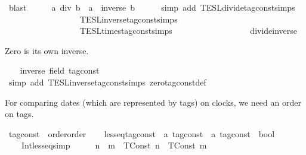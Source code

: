 \begin{isabellebody}
\ blast\isanewline
\ \ \isamarkupfalse%
\ \isamarkupfalse%
\ {\isacartoucheopen}a\ div\ b\ {\isacharequal}\ a\ {\isacharasterisk}\ inverse\ b{\isacartoucheclose}\isanewline
\ \ \ \ \isamarkupfalse%
\ {\isacharparenleft}simp\ add{\isacharcolon}\ TESL{\isachardot}divide{\isacharunderscore}tag{\isacharunderscore}const{\isachardot}simps\isanewline
\ \ \ \ \ \ \ \ \ \ \ \ \ \ \ \ \ \ TESL{\isachardot}inverse{\isacharunderscore}tag{\isacharunderscore}const{\isachardot}simps\isanewline
\ \ \ \ \ \ \ \ \ \ \ \ \ \ \ \ \ \ TESL{\isachardot}times{\isacharunderscore}tag{\isacharunderscore}const{\isachardot}simps\isanewline
\ \ \ \ \ \ \ \ \ \ \ \ \ \ \ \ \ \ divide{\isacharunderscore}inverse{\isacharparenright}\isanewline
{}\isamarkupfalse%
%
\begin{isamarkuptext}%
Zero is its own inverse.%
\end{isamarkuptext}\isamarkuptrue%
\ \ \isamarkupfalse%
\ {\isacartoucheopen}inverse\ {\isacharparenleft}{}{\isacharcolon}{\isacharcolon}{\isacharparenleft}{\isacharprime}{\isasymtau}{\isacharcolon}{\isacharcolon}field\ tag{\isacharunderscore}const{\isacharparenright}{\isacharparenright}\ {\isacharequal}\ {}{\isacartoucheclose}\isanewline
\ \ \ \ \isamarkupfalse%
\ {\isacharparenleft}simp\ add{\isacharcolon}\ TESL{\isachardot}inverse{\isacharunderscore}tag{\isacharunderscore}const{\isachardot}simps\ zero{\isacharunderscore}tag{\isacharunderscore}const{\isacharunderscore}def{\isacharparenright}\isanewline
{}\isamarkupfalse%
%
\endisatagproof
{\isafoldproof}%
%
\isadelimproof
%
\endisadelimproof
\isanewline
\isanewline
{}\isamarkupfalse%
%
\begin{isamarkuptext}%
For comparing dates (which are represented by tags) on clocks, we need an order on tags.%
\end{isamarkuptext}\isamarkuptrue%
\isamarkupfalse%
\ tag{\isacharunderscore}const\ {\isacharcolon}{\isacharcolon}\ {\isacharparenleft}order{\isacharparenright}order\isanewline
{}\isanewline
\ \ \isamarkupfalse%
\ less{\isacharunderscore}eq{\isacharunderscore}tag{\isacharunderscore}const\ {\isacharcolon}{\isacharcolon}\ {\isacartoucheopen}{\isacharprime}a\ tag{\isacharunderscore}const\ {\isasymRightarrow}\ {\isacharprime}a\ tag{\isacharunderscore}const\ {\isasymRightarrow}\ bool{\isacartoucheclose}\isanewline
\ \ \isanewline
\ \ \ \ Int{\isacharunderscore}less{\isacharunderscore}eq{\isacharbrackleft}simp{\isacharbrackright}{\isacharcolon}\ \ \ \ \ \ {\isacartoucheopen}n\ {\isasymle}\ m\ {\isasymLongrightarrow}\ {\isacharparenleft}TConst\ n{\isacharparenright}\ {\isasymle}\ {\isacharparenleft}TConst\ m{\isacharparenright}{\isacartoucheclose}\isanewline

\end{isabellebody}
